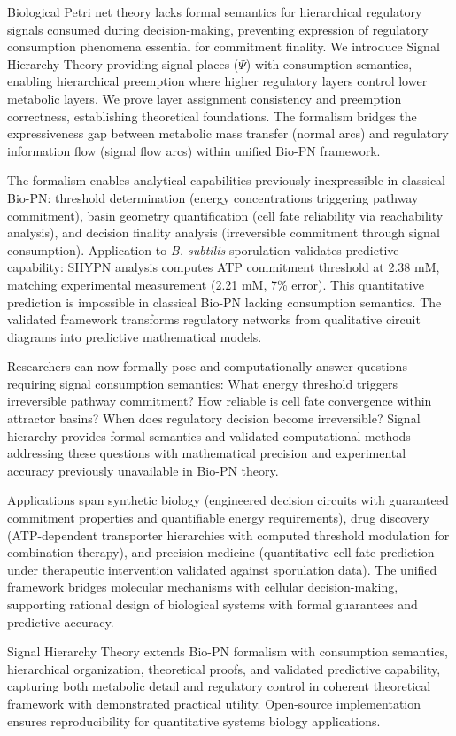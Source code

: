 
Biological Petri net theory lacks formal semantics for hierarchical regulatory signals consumed during decision-making, preventing expression of regulatory consumption phenomena essential for commitment finality. We introduce Signal Hierarchy Theory providing signal places ($\Psi$) with consumption semantics, enabling hierarchical preemption where higher regulatory layers control lower metabolic layers. We prove layer assignment consistency and preemption correctness, establishing theoretical foundations. The formalism bridges the expressiveness gap between metabolic mass transfer (normal arcs) and regulatory information flow (signal flow arcs) within unified Bio-PN framework.

\vspace{3pt}
\noindent The formalism enables analytical capabilities previously inexpressible in classical Bio-PN: threshold determination (energy concentrations triggering pathway commitment), basin geometry quantification (cell fate reliability via reachability analysis), and decision finality analysis (irreversible commitment through signal consumption). Application to \textit{B. subtilis} sporulation validates predictive capability: SHYPN analysis computes ATP commitment threshold at 2.38 mM, matching experimental measurement (2.21 mM, 7\% error). This quantitative prediction is impossible in classical Bio-PN lacking consumption semantics. The validated framework transforms regulatory networks from qualitative circuit diagrams into predictive mathematical models.

\vspace{3pt}
\noindent Researchers can now formally pose and computationally answer questions requiring signal consumption semantics: What energy threshold triggers irreversible pathway commitment? How reliable is cell fate convergence within attractor basins? When does regulatory decision become irreversible? Signal hierarchy provides formal semantics and validated computational methods addressing these questions with mathematical precision and experimental accuracy previously unavailable in Bio-PN theory.

\vspace{3pt}
\noindent Applications span synthetic biology (engineered decision circuits with guaranteed commitment properties and quantifiable energy requirements), drug discovery (ATP-dependent transporter hierarchies with computed threshold modulation for combination therapy), and precision medicine (quantitative cell fate prediction under therapeutic intervention validated against sporulation data). The unified framework bridges molecular mechanisms with cellular decision-making, supporting rational design of biological systems with formal guarantees and predictive accuracy.

\vspace{3pt}
\noindent Signal Hierarchy Theory extends Bio-PN formalism with consumption semantics, hierarchical organization, theoretical proofs, and validated predictive capability, capturing both metabolic detail and regulatory control in coherent theoretical framework with demonstrated practical utility. Open-source implementation ensures reproducibility for quantitative systems biology applications.
